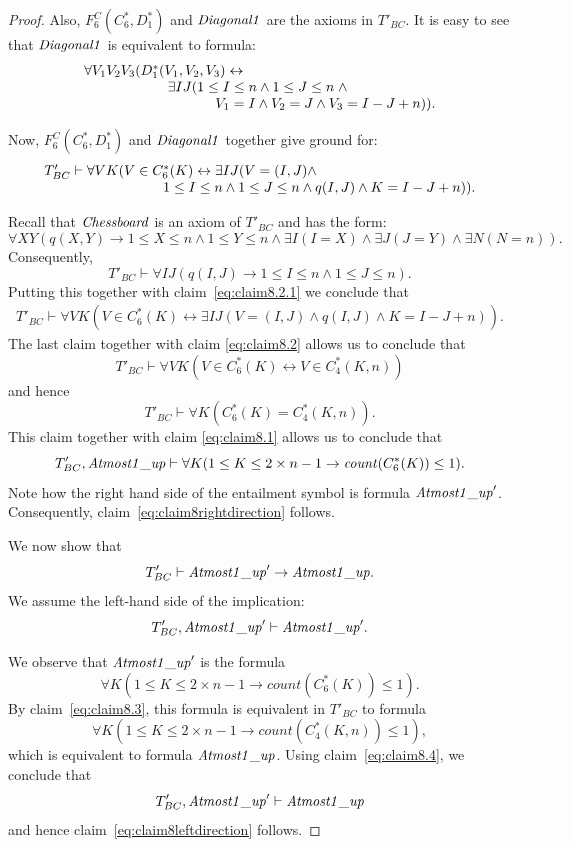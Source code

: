 \documentclass[11pt]{article}
\def\lrar{\leftrightarrow}
\def\beq{\begin{equation}}
\def\eeq#1{\label{#1}\end{equation}}
\def\ba{\begin{array}}
\def\ea{\end{array}}
\newcommand{\co}{\ensuremath{\mathit{count}}}
\def\dOne{\mathit{Chessboard\/}}
\def\bFourfs{\mathit{Atmost1\_up\/}}
\def\diagO{\mathit{Diagonal1\/}}
\begin{document}
\begin{adjustwidth}{-1cm}{-1cm}
\begin{proof}
   Also, $F^C_6(C^*_6,D^*_1)$ and $\diagO$ are the axioms in $T'_{BC}$. It is easy to see that $\diagO$ is equivalent to formula:
$$\ba l
\forall V_1V_2V_3( D^*_1(V_1,V_2,V_3)\lrar\\
\hskip 21mm
\exists I J  (1\leq I\leq n \land 1\leq J\leq n\;\land\\
\hskip 33mm
 V_1=I\land V_2=J \land V_3= I-J+n)).
\ea
$$

Now, $F^C_6(C^*_6,D^*_1)$ and $\diagO$ together give ground for:
\beq
\ba{l}
T'_{BC}\vdash \forall VK(V\in C^*_6(K) \lrar \exists IJ(
V=(I,J)\land\\  
\hspace{30mm}
1\leq I\leq n \land 1\leq J\leq n \land q(I,J)
   \land K=I-J+n)).
   \ea
   \eeq{eq:claim8.2.1}

   Recall that $\dOne$ is an axiom of  $T'_{BC}$ and has the form:
   $$
\forall X Y (q(X,Y) \to
1 \leq X \leq n \land 1 \leq Y \leq n \land \exists I(I=X)
\land \exists J(J=Y) \land \exists N(N=n)).
$$
Consequently,
$$T'_{BC}\vdash \forall I J (q(I,J) \to  1 \leq I \leq n \land 1 \leq J \leq n).
$$
Putting this together with claim~\eqref{eq:claim8.2.1} we conclude that
$$
\ba{l}
T'_{BC}\vdash \forall VK(V\in C^*_6(K) \lrar \exists IJ(
V=(I,J)
\land q(I,J)
   \land K=I-J+n)).
   \ea
$$  
The last claim together with claim \eqref{eq:claim8.2} allows us to conclude that
$$T'_{BC}\vdash 
\forall VK(V\in C^*_6(K)\lrar V\in C^*_4(K,n))$$ 
and hence
\beq
T'_{BC}\vdash 
\forall K(C^*_6(K)=C^*_4(K,n)).
\eeq{eq:claim8.3}
This claim together with claim \eqref{eq:claim8.1} allows us to conclude that
$$T'_{BC},\bFourfs\vdash  \forall K(1\leq K\leq 2\times n-1   \to \co(C^*_6(K))\leq 1).
$$
Note how the right hand side of the entailment symbol is formula $\bFourfs'$. Consequently, claim~\eqref{eq:claim8rightdirection} follows.


We now show that
\beq
T'_{BC}\vdash    \bFourfs' \to \bFourfs.
\eeq{eq:claim8leftdirection}
We assume the left-hand side of the implication:
\beq
T'_{BC},\bFourfs'\vdash  \bFourfs'.
\eeq{eq:claim8.4}  

We observe that $\bFourfs'$ is the formula
  $$
  \forall K(1\leq K\leq 2\times n-1   \to \co(C^*_6(K))\leq 1).
$$
By claim~\eqref{eq:claim8.3}, this formula is equivalent in $T'_{BC}$ to formula
$$
\forall K(1\leq K\leq 2\times n-1   \to \co(C^*_4(K,n))\leq 1),
$$
which is equivalent to formula $\bFourfs$. Using claim~\eqref{eq:claim8.4}, we conclude that
$$T'_{BC},\bFourfs'\vdash  \bFourfs$$
and hence claim~\eqref{eq:claim8leftdirection} follows.
\end{proof}








\end{adjustwidth}
\end{document}
